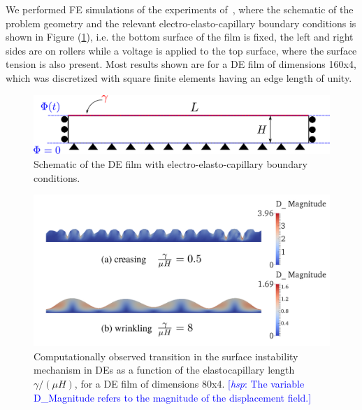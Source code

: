 \documentclass[8.5pt,twoside,twocolumn]{article}
\newcommand{\hsp}[1]{\textcolor{blue}{[\textit{hsp}: #1]}}
\begin{document}
We performed FE simulations of the experiments of~\citet{wangPRE2013}, where the schematic of the problem geometry and the relevant electro-elasto-capillary boundary conditions is shown in Figure (\ref{film}), i.e. the bottom surface of the film is fixed, the left and right sides are on rollers while a voltage is applied to the top surface, where the surface tension is also present.   Most results shown are for a DE film of dimensions 160x4, which was discretized with square finite elements having an edge length of unity.

\begin{figure} \begin{center} 
\includegraphics[scale=0.4]{pics/film.pdf}
\caption{Schematic of the DE film with electro-elasto-capillary boundary conditions.}
\label{film} \end{center} \end{figure}

\begin{figure} \begin{center} 
\includegraphics[scale=0.22]{pics/wrinkcreas.pdf}
\caption{Computationally observed transition in the surface instability mechanism in DEs as a function of the elastocapillary length $\gamma/(\mu H)$, for a DE film of dimensions 80x4.  \hsp{The variable D_Magnitude refers to the magnitude of the displacement field.}}
\label{wrinkcreas} \end{center} \end{figure}
\end{document}
